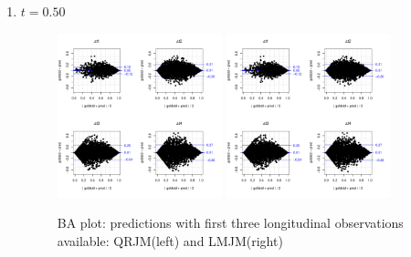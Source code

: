 \documentclass{article}
\begin{document}
\begin{enumerate}
\item $t=0.50$
\begin{figure}[H]
\centering
\includegraphics[width=0.45\textwidth]{qt25fit_t2.pdf}
\includegraphics[width=0.45\textwidth]{meanfit_t2.pdf}
\caption{BA plot: predictions with first three longitudinal observations available: QRJM(left) and LMJM(right)}
\end{figure}



\end{enumerate}
\end{document}
